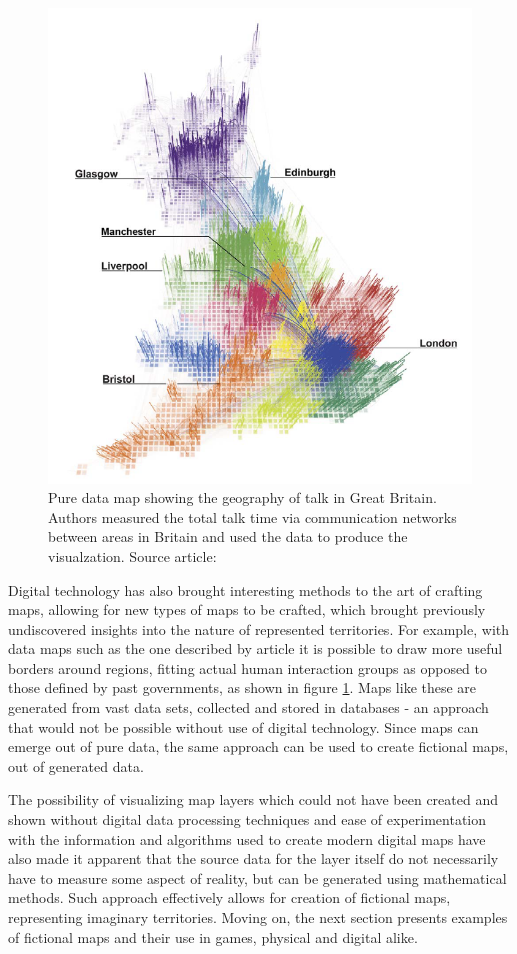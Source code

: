 \documentclass[12pt]{report}
\begin{document}
\begin{figure}[h!]
	\centering
	\includegraphics[width=0.6\linewidth]{images/journal_netw_talk_map}
	\caption{Pure data map showing the geography of talk in Great Britain. Authors measured the total talk time via communication networks between areas in Britain and used the data to produce the visualzation. Source article: \autocite{10.1371/journal.pone.0014248}}
	\label{fig:journalnetwtalkmap}
\end{figure}


Digital technology has also brought interesting methods to the art of crafting maps, allowing for new types of maps to be crafted, which brought previously undiscovered insights into the nature of represented territories. For example, with data maps such as the one described by article \autocite{10.1371/journal.pone.0014248} it is possible to draw more useful borders around regions, fitting actual human interaction groups as opposed to those defined by past governments, as shown in figure \cref{fig:journalnetwtalkmap}. Maps like these are generated from vast data sets, collected and stored in databases - an approach that would not be possible without use of digital technology. Since maps can emerge out of pure data, the same approach can be used to create fictional maps, out of generated data.

The possibility of visualizing map layers which could not have been created and shown without digital data processing techniques and ease of experimentation with the information and algorithms used to create modern digital maps have also made it apparent that the source data for the layer itself do not necessarily have to measure some aspect of reality, but can be generated using mathematical methods. Such approach effectively allows for creation of fictional maps, representing imaginary territories. Moving on, the next section presents examples of fictional maps and their use in games, physical and digital alike. 
\end{document}
